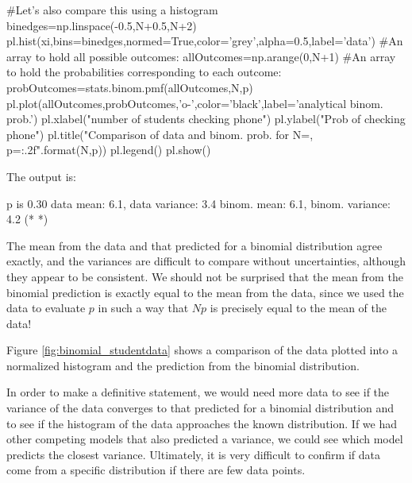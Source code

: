 \begin{example}
\begin{python}[caption = Evaluating binomial quantities]
#Let's also compare this using a histogram
binedges=np.linspace(-0.5,N+0.5,N+2)
pl.hist(xi,bins=binedges,normed=True,color='grey',alpha=0.5,label='data')
#An array to hold all possible outcomes:
allOutcomes=np.arange(0,N+1)
#An array to hold the probabilities corresponding to each outcome:
probOutcomes=stats.binom.pmf(allOutcomes,N,p)
pl.plot(allOutcomes,probOutcomes,'o-',color='black',label='analytical binom. prob.')
pl.xlabel("number of students checking phone")
pl.ylabel("Prob of checking phone")
pl.title("Comparison of data and binom. prob. for N={}, p={:.2f}".format(N,p))
pl.legend()
pl.show()
\end{python}
The output is:
\begin{poutput}
p is 0.30
data mean: 6.1, data variance: 3.4
binom. mean: 6.1, binom. variance: 4.2
(*  *)
\end{poutput}
The mean from the data and that predicted for a binomial distribution agree exactly, and the variances are difficult to compare without uncertainties, although they appear to be consistent. We should not be surprised that the mean from the binomial prediction is exactly equal to the mean from the data, since we used the data to evaluate $p$ in such a way that $Np$ is precisely equal to the mean of the data!

Figure \ref{fig:binomial_studentdata} shows a comparison of the data plotted into a normalized histogram and the prediction from the binomial distribution.



In order to make a definitive statement, we would need more data to see if the variance of the data converges to that predicted for a binomial distribution and to see if the histogram of the data approaches the known distribution. If we had other competing models that also predicted a variance, we could see which model predicts the closest variance. Ultimately, it is very difficult to confirm if data come from a specific distribution if there are few data points.
\end{example}

